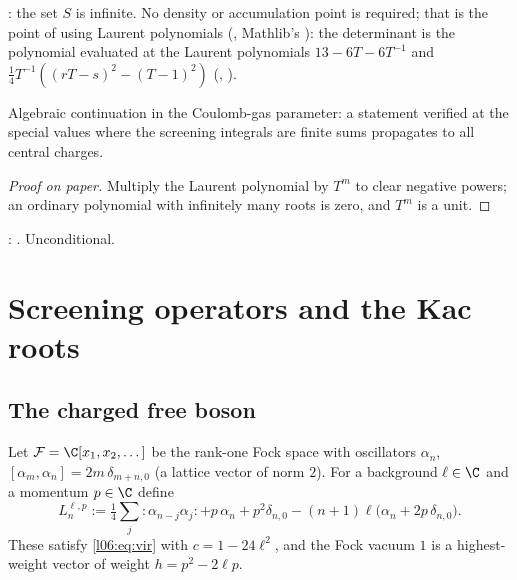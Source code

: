 \begin{dictionary}
: the set $S$ is infinite. No density or accumulation point is required; that is the
point of using Laurent polynomials (, Mathlib's ): the
determinant is the polynomial  evaluated at the Laurent polynomials
$13-6T-6T^{-1}$ and $\frac14T^{-1}((rT-s)^2-(T-1)^2)$ (, ).
\end{dictionary}

\begin{physics}
Algebraic continuation in the Coulomb-gas parameter: a statement verified at the special values where the
screening integrals are finite sums propagates to all central charges.
\end{physics}

\begin{proof}[Proof on paper]
Multiply the Laurent polynomial by $T^m$ to clear negative powers; an ordinary polynomial with infinitely
many roots is zero, and $T^m$ is a unit.
\end{proof}

\begin{status}
\allowbreak{}\allowbreak{}\allowbreak{}: \lean{[propext, Classical.}\allowbreak{}\allowbreak\lean{sound]}. Unconditional.
\end{status}

\section{Screening operators and the Kac roots}\label{l06:sec:screening}

\subsection{The charged free boson}

\begin{definition}\label{l06:def:chargedfock}
Let $\mathcal F = \C[x_1,x_2,\dots]$ be the rank-one Fock space with oscillators $\alpha_n$,
$[\alpha_m,\alpha_n] = 2m\,\delta_{m+n,0}$ (a lattice vector of norm $2$). For a background $\ell\in\C$ and a
momentum $p\in\C$ define
\begin{equation*}
 L^{\ell,p}_n := \tfrac14\sum_j{:}\alpha_{n-j}\alpha_j{:}+p\,\alpha_n+p^2\delta_{n,0}
 -(n+1)\ell\bigl(\alpha_n+2p\,\delta_{n,0}\bigr).
\end{equation*}
These satisfy \eqref{l06:eq:vir} with $c = 1-24\ell^2$, and the Fock vacuum $1$ is a highest-weight vector
of weight $h = p^2-2\ell p$.
\end{definition}


